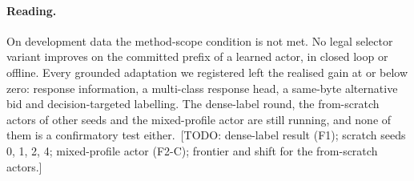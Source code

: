 \documentclass[11pt]{article}
\theoremstyle{definition}
\newif\ifshownotes\shownotestrue
\newcommand{\TODO}[1]{\ifshownotes{\color{todocol}\,\textsf{\footnotesize[TODO: #1]}}\fi}
\begin{document}
\paragraph{Reading.} On development data the method-scope condition is not met. No legal selector
variant improves on the committed prefix of a learned actor, in closed loop or offline. Every grounded
adaptation we registered left the realised gain at or below zero: response information, a multi-class
response head, a same-byte alternative bid and decision-targeted labelling. The dense-label round, the
from-scratch actors of other seeds and the mixed-profile actor are still running, and none of them is a
confirmatory test either.
\TODO{dense-label result (F1); scratch seeds 0, 1, 2, 4; mixed-profile actor (F2-C); frontier and shift for the from-scratch actors.}
\end{document}
